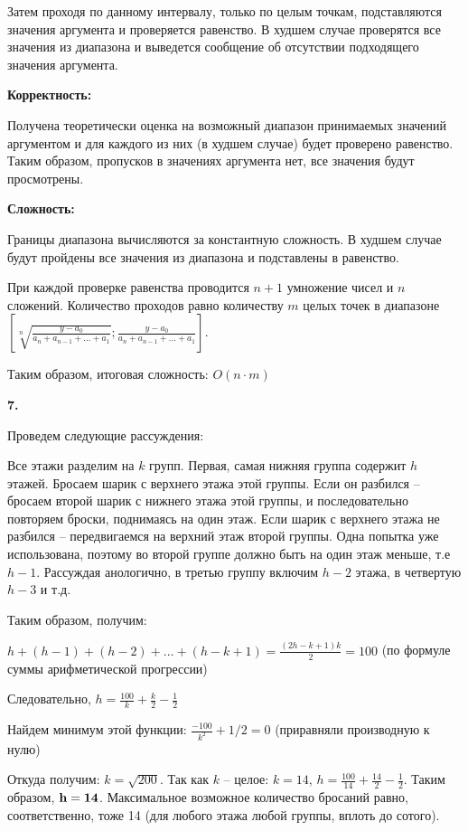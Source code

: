 \documentclass[12pt]{extreport}
\begin{document}
Затем проходя по данному интервалу, только по целым точкам, подставляются значения аргумента и проверяется равенство. В худшем случае проверятся все значения из диапазона и выведется сообщение об отсутствии подходящего значения аргумента. 

\bigskip 
{\bf Корректность:}

Получена теоретически оценка на возможный диапазон принимаемых значений аргументом и для каждого из них (в худшем случае) будет проверено равенство. Таким образом, пропусков в значениях аргумента нет, все значения будут просмотрены.

\bigskip 
{\bf Сложность:} 

Границы диапазона вычисляются за константную сложность. В худшем случае будут пройдены все значения из диапазона и подставлены в равенство. 

При каждой проверке равенства проводится $n+1$ умножение чисел и $n$ сложений. Количество проходов равно количеству $m$ целых точек в диапазоне $[\sqrt[n]{\frac{y-a_0}{a_n+a_{n-1}+...+a_1}};\frac{y-a_0}{a_n+a_{n-1}+...+a_1}]$. 

Таким образом, итоговая сложность: $O(n \cdot m)$

\bigskip 

{\bf 7.} 

Проведем следующие рассуждения: 

Все этажи разделим на $k$ групп. Первая, самая нижняя группа содержит $h$ этажей. Бросаем шарик с верхнего этажа этой группы. Если он разбился -- бросаем второй шарик с нижнего этажа этой группы, и последовательно повторяем броски, поднимаясь на один этаж. Если шарик с верхнего этажа не разбился -- передвигаемся на верхний этаж второй группы. Одна попытка уже использована, поэтому во второй группе должно быть на один этаж меньше, т.е $h-1$. Рассуждая анологично, в третью группу включим $h-2$ этажа, в четвертую $h-3$ и т.д.

Таким образом, получим: 

$h + (h-1) + (h-2) + ... + (h-k+1) = \frac{(2h-k+1)k}{2}=100$ (по формуле суммы арифметической прогрессии)

Следовательно, $h = \frac{100}{k}+\frac{k}{2}- \frac{1}{2} $

Найдем минимум этой функции: $\frac{-100}{k^2} + 1/2 = 0 $ (приравняли производную к нулю)

Откуда получим: $k = \sqrt{200}$. Так как $k$ -- целое: $k=14$, $h = \frac{100}{14} +\frac{14}{2}-\frac{1}{2}$. Таким образом, ${\bf h=14}$. Максимальное возможное количество бросаний равно, соответственно, тоже 14 (для любого этажа любой группы, вплоть до сотого). 
\end{document}
